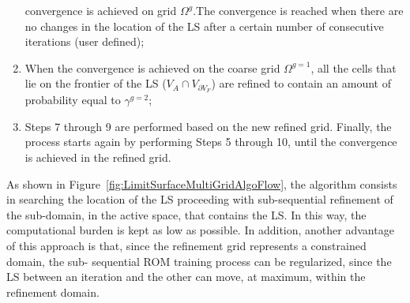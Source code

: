 \begin{enumerate}
     convergence is achieved on grid $\Omega^{g}$.The convergence 
     is reached when there are no changes in the location of the LS 
     after a certain number of consecutive iterations (user defined);
     \item When the convergence is achieved on the coarse grid 
     $\Omega^{g=1}$, all the cells that lie on the frontier of the LS 
     ($V_{A} \cap V_{\partial V_{F}}$) are refined to contain an amount of 
     probability equal to  $\gamma^{g=2}$;
     \item Steps 7 through 9 are performed based on the new refined 
     grid. Finally, the process starts again by performing Steps 5 
     through 10, until the convergence is achieved in the refined grid.
\end{enumerate}
As shown in Figure~\ref{fig:LimitSurfaceMultiGridAlgoFlow}, the 
algorithm consists in searching the location of the LS proceeding with 
sub-sequential refinement of the sub-domain, in the active space, that 
contains the LS. In this way, the computational burden is kept as low as 
possible. In addition, another advantage of this approach is that, since 
the refinement grid represents a constrained domain, the sub-
sequential ROM training process can be regularized, since the LS 
between an iteration and the other can move, at maximum, within the 
refinement domain.

